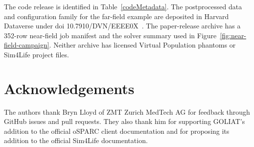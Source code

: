 \documentclass[final,5p,times,twocolumn]{elsarticle}
\begin{document}
The code release is identified in Table~\ref{codeMetadata}. The postprocessed data and configuration family for the far-field example are deposited in Harvard Dataverse under \gls{doi} 10.7910/DVN/EEEE0X~\cite{GOLIATFarFieldData}. The paper-release archive has a 352-row near-field job manifest and the solver summary used in Figure~\ref{fig:near-field-campaign}. Neither archive has licensed Virtual Population phantoms or Sim4Life project files.

\section*{Acknowledgements}

The authors thank Bryn Lloyd of ZMT Zurich MedTech AG for feedback through GitHub issues and pull requests. They also thank him for supporting GOLIAT's addition to the official oSPARC client documentation and for proposing its addition to the official Sim4Life documentation.



\end{document}
